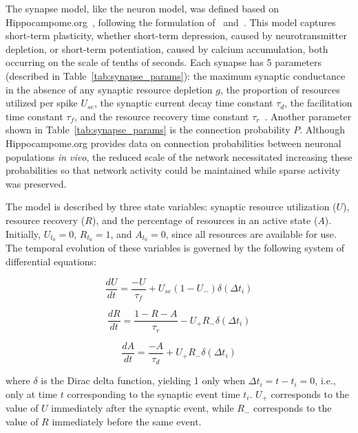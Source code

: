 The synapse model, like the neuron model, was defined based on Hippocampome.org~\parencite{wheelerHippocampomeorg2023}, following the
formulation of~\textcite{sennAlgorithm2001} and~\textcite{mongilloSynaptic2008a}. This model captures short-term plasticity, whether
short-term depression, caused by neurotransmitter depletion, or short-term potentiation, caused by calcium
accumulation, both occurring on the scale of tenths of seconds. Each synapse has 5 parameters (described in
Table~\ref{tab:synapse_params}): the maximum synaptic conductance in the absence of any synaptic resource depletion $g$, the
proportion of resources utilized per spike $U_{se}$, the synaptic current decay time constant $\tau_d$, the facilitation time
constant $\tau_f$, and the resource recovery time constant $\tau_r$~\parencite{moradiNormalized2022}. Another parameter shown in
Table~\ref{tab:synapse_params} is the connection probability $P$. Although Hippocampome.org provides data on connection
probabilities between neuronal populations \textit{in vivo}, the reduced scale of the network necessitated increasing these
probabilities so that network activity could be maintained while sparse activity was preserved.

The model is described by three state variables: synaptic resource utilization ($U$), resource recovery ($R$), and the
percentage of resources in an active state ($A$). Initially, $U_{t_0} = 0$, $R_{t_0} = 1$, and $A_{t_0} = 0$, since all
resources are available for use. The temporal evolution of these variables is governed by the following system of differential
equations:

\begin{equation}
    \label{eq_tsodyks_dU}
    \frac{dU}{dt} = \frac{-U}{\tau_f} + U_{se}(1-U_{-}) \delta(\Delta t_i)
\end{equation}

\begin{equation}
    \label{eq_tsodyks_dR}
    \frac{dR}{dt} = \frac{1-R-A}{\tau_r} - U_{+} R_{-} \delta(\Delta t_i)
\end{equation}

\begin{equation}
    \label{eq_tsodyks_dA}
    \frac{dA}{dt} = \frac{-A}{\tau_d} + U_{+} R_{-} \delta(\Delta t_i)
\end{equation}

where $\delta$ is the Dirac delta function, yielding 1 only when $\Delta t_i = t - t_i = 0$, i.e., only at time $t$
corresponding to the synaptic event time $t_i$. $U_{+}$ corresponds to the value of $U$ immediately after the synaptic event,
while $R_{-}$ corresponds to the value of $R$ immediately before the same event.

